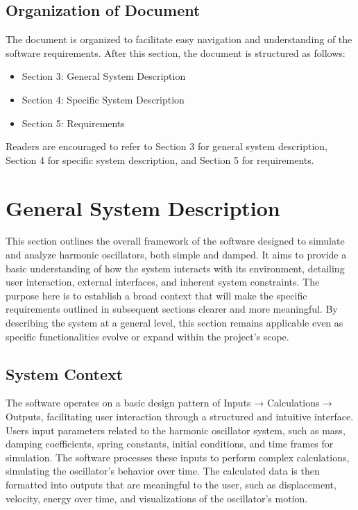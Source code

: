 \documentclass[12pt]{article}
\begin{document}
\subsection{Organization of Document}

The document is organized to facilitate easy navigation and understanding 
of the software requirements. After this section, the document is structured 
as follows:

\begin{itemize}
  \item Section 3: General System Description
  \item Section 4: Specific System Description
  \item Section 5: Requirements
\end{itemize}

Readers are encouraged to refer to Section 3 for general system description, 
Section 4 for specific system description, and Section 5 for requirements.

\section{General System Description}

This section outlines the overall framework of the software designed to 
simulate and analyze harmonic oscillators, both simple and damped. It aims 
to provide a basic understanding of how the system interacts with 
its environment, detailing user interaction, external interfaces, and 
inherent system constraints. The purpose here is to establish a broad 
context that will make the specific requirements outlined in subsequent 
sections clearer and more meaningful. By describing the system at a general 
level, this section remains applicable even as specific functionalities 
evolve or expand within the project's scope.

\subsection{System Context}

The software operates on a basic design pattern of Inputs → Calculations 
→ Outputs, facilitating user interaction through a structured and intuitive 
interface. Users input parameters related to the harmonic oscillator system, 
such as mass, damping coefficients, spring constants, initial conditions, 
and time frames for simulation. The software processes these inputs to 
perform complex calculations, simulating the oscillator's behavior over 
time. The calculated data is then formatted into outputs that are meaningful 
to the user, such as displacement, velocity, energy over time, and 
visualizations of the oscillator's motion.
\end{document}
